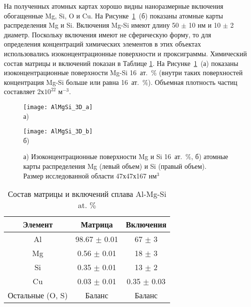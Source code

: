 На полученных атомных картах хорошо видны наноразмерные включения обогащенные Mg, Si, O и Cu. На Рисунке~\cref{fig:AlMgSi_3D}~(б) показаны атомные карты распределения Mg и Si. Включения Mg-Si имеют длину 50 $\pm$ 10 нм и 10 $\pm$ 2 диаметр. Поскольку включения имеют не сферическую форму, то для определения концентраций химических элементов в этих объектах использовались изоконцентрационные поверхности и проксиграммы. Химический состав матрицы и включений показан в Таблице \cref{tab:AlMgSi_table}. На Рисунке~\cref{fig:AlMgSi_3D}~(а) показаны изоконцентрационные поверхности Mg-Si 16~ат.~$\%$ (внутри таких поверхностей концентрация Mg-Si больше или равна 16~ат.~$\%$). Объемная плотность частиц составляет 2х$10^{22}$ м$^{-3}$.

\begin{figure}[htbp]
	\begin{minipage}[b][][b]{0.49\textwidth}\centering
		\texttt{[image: AlMgSi\_3D\_a]} \\ а)
	\end{minipage}
	\begin{minipage}[b][][b]{0.49\textwidth}\centering
		\texttt{[image: AlMgSi\_3D\_b]} \\ б)
	\end{minipage}
	\caption{а) Изоконцентрационные поверхности Mg и Si 16~ат.~$\%$, б) атомные карты распределения Mg (левый объем) и Si (правый объем). Размер исследованной области 47х47х167 нм$^3$}
	\label{fig:AlMgSi_3D}
\end{figure} 

\begin{table} [htbp]
	\centering
	\caption{Состав матрицы и включений сплава Al-Mg-Si at. $\%$}%
	\label{tab:AlMgSi_table}%
	\begin{SingleSpace}
		\begin{tabular}{| c | c | c |}
			\hline
			Элемент & Матрица & Включения \\ \hline
			Al & 98.67 $\pm$ 0.01 & 67 $\pm$ 3 \\ \hline
			Mg & 0.56 $\pm$ 0.01 & 18 $\pm$ 3 \\ \hline
			Si & 0.35 $\pm$ 0.01 & 13 $\pm$ 2 \\ \hline						
			Cu & 0.03 $\pm$ 0.01 & 0.35 $\pm$ 0.03\\ \hline
			Остальные (O, S) & Баланс & Баланс \\ \hline			
		\end{tabular}%
	\end{SingleSpace}
\end{table}

